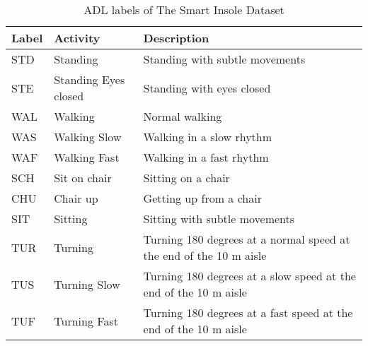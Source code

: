 \vspace{0.5cm} 

\begin{table} [ht!]
    \centering
    \begin{tabular}{|>{\centering}m{2.5cm} |>{\centering}m{2.5cm} |>{\centering}m{6.5cm} |}
        \hline
         \textbf{Label}   &  \textbf{Activity}   &  \textbf{Description}  \tabularnewline
        \hline
        STD	& Standing	& Standing with subtle movements \tabularnewline
        \hline
        STE	& Standing Eyes closed & Standing with eyes closed \tabularnewline
        \hline
        WAL &	Walking &	Normal walking \tabularnewline
        \hline
        WAS	& Walking Slow	& Walking in a slow rhythm \tabularnewline
        \hline
        WAF	& Walking Fast	& Walking in a fast rhythm \tabularnewline
        \hline
        SCH	&Sit on chair &	Sitting on a chair \tabularnewline
        \hline
        CHU	& Chair up&	Getting up from a chair \tabularnewline
        \hline
        SIT	& Sitting	& Sitting with subtle movements \tabularnewline
        \hline
        TUR	&Turning&	Turning 180 degrees at a normal speed at the end of the 10 m aisle \tabularnewline
        \hline
        TUS	& Turning Slow	& Turning 180 degrees at a slow speed at the end of the 10 m aisle \tabularnewline
        \hline
        TUF	& Turning Fast&	Turning 180 degrees at a fast speed at the end of the 10 m aisle \tabularnewline
        \hline
    \end{tabular} 
    \caption{ADL labels of The Smart Insole Dataset}
    \label{tab:SmartInsoleADL}
\end{table}